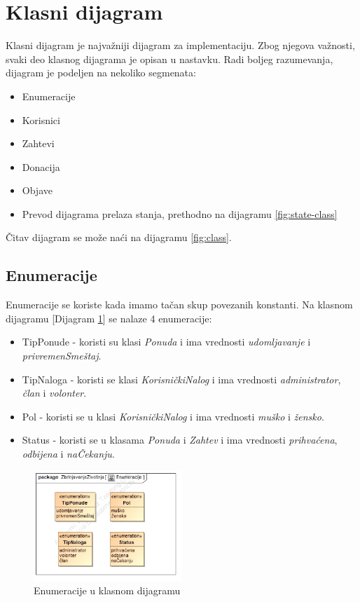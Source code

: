 \section{Klasni dijagram}
\par Klasni dijagram je najvažniji dijagram za implementaciju. Zbog njegova važnosti, svaki deo klasnog dijagrama je opisan u nastavku.
Radi boljeg razumevanja, dijagram je podeljen na nekoliko segmenata:
\begin{itemize}
    \item Enumeracije
    \item Korisnici
    \item Zahtevi
    \item Donacija
    \item Objave
    \item Prevod dijagrama prelaza stanja, prethodno na dijagramu \ref{fig:state-class}
\end{itemize}
Čitav dijagram se može naći na dijagramu \ref{fig:class}.
\subsection{Enumeracije}
\par Enumeracije se koriste kada imamo tačan skup povezanih konstanti. Na klasnom dijagramu [Dijagram \ref{fig:enums}] se nalaze 4 enumeracije: 
\begin{itemize}
    \item TipPonude - koristi su klasi \textit{Ponuda} i ima vrednosti \textit{udomljavanje} i \textit{privremenSmeštaj}.
    \item TipNaloga - koristi se klasi \textit{KorisničkiNalog} i ima vrednosti \textit{administrator}, \textit{član} i \textit{volonter}.
    \item Pol - koristi se u klasi \textit{KorisničkiNalog} i ima vrednosti \textit{muško} i \textit{žensko}.
    \item Status - koristi se u klasama \textit{Ponuda} i \textit{Zahtev} i ima vrednosti \textit{prihvaćena}, \textit{odbijena} i \textit{naČekanju}.
\end{itemize}
\begin{figure}[h]
    \centering
    \includegraphics[width=0.5\textwidth, height=0.4\textwidth]{img/enums.jpg}
    \caption{Enumeracije u klasnom dijagramu}
    \label{fig:enums}
\end{figure}
